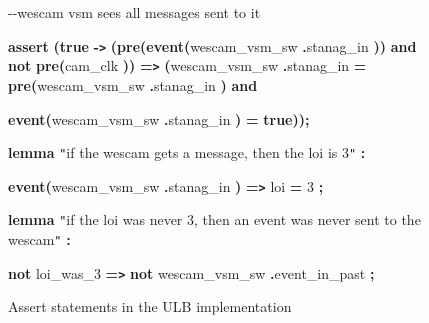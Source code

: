 \begin{figure}
{{\vspace{12pt}
{\color{color17} -{}-wescam vsm sees all messages sent to it}

{\color{color18} \textbf{assert}} {\color{color18} \textbf{(true}} {\color{color18} \textbf{-\texttt{>}}} 
{\color{color18} \textbf{(pre(event(}}wescam\_vsm\_sw{\color{color18} \textbf{.}}stanag\_in{\color{color18} \textbf{))}} 
{\color{color18} \textbf{and}} {\color{color18} \textbf{not}} {\color{color18} \textbf{pre(}}cam\_clk{\color{color18} \textbf{)) 
 }}
{\color{color18} \textbf{=\texttt{>}}} {\color{color18} \textbf{(}}wescam\_vsm\_sw{\color{color18} \textbf{.}}stanag\_in 
{\color{color18} \textbf{=}} {\color{color18} \textbf{pre(}}wescam\_vsm\_sw{\color{color18} \textbf{.}}stanag\_in{\color{color18} \textbf{)}} 
{\color{color18} \textbf{and}}      

{\color{color18} \textbf{event(}}wescam\_vsm\_sw{\color{color18} \textbf{.}}stanag\_in{\color{color18} \textbf{)}} 
{\color{color18} \textbf{=}} {\color{color18} \textbf{true));        }}

\vspace{12pt}
{\color{color18} \textbf{lemma}} {\color{color19} \texttt{"}if the wescam gets 
a message, then the loi is 3\texttt{"}} {\color{color18} \textbf{:  }}

{\color{color18} \textbf{event(}}wescam\_vsm\_sw{\color{color18} \textbf{.}}stanag\_in{\color{color18} \textbf{)}} 
{\color{color18} \textbf{=\texttt{>}}} loi {\color{color18} \textbf{=}} 3{\color{color18} \textbf{;}}

\vspace{12pt}
{\color{color18} \textbf{lemma}} {\color{color19} \texttt{"}if the loi was never 
3, then an event was never sent to the wescam\texttt{"}} {\color{color18} \textbf{: 
 }}

\baselineskip=13pt
{\color{color18} \textbf{not}} loi\_was\_3 {\color{color18} \textbf{=\texttt{>}}} 
{\color{color18} \textbf{not}} wescam\_vsm\_sw{\color{color18} \textbf{.}}event\_in\_past{\color{color18} \textbf{;}}

}%
}
\caption{Assert statements in the ULB implementation}
\label{fig:ulb-impl}
\end{figure}